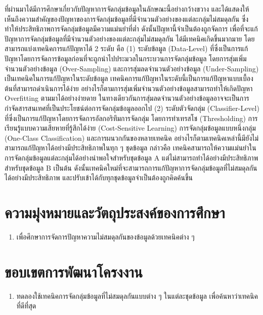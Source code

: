 ที่ผ่านมาได้มีการศึกษาเกี่ยวกับปัญหาการจัดกลุ่มข้อมูลในลักษณะนี้อย่างกว้างขวาง และได้แสดงให้เห็นถึงความสำคัญของปัญหาของการจัดกลุ่มข้อมูลที่มีจำนวนตัวอย่างของแต่ละกลุ่มไม่สมดุลกัน 
ซึ่งทำให้ประสิทธิภาพการจัดกลุ่มข้อมูลมีความแม่นยำที่ต่ำ ดังนั้นปัญหานี้จำเป็นต้องถูกจัดการ \cite{Buda:2017} เพื่อที่จะแก้ปัญหาการจัดกลุ่มข้อมูลที่มีจำนวนตัวอย่างของแต่ละกลุ่มไม่สมดุลกัน 
ได้มีเทคนิคเกิดขึ้นมากมาย โดยสามารถแบ่งเทคนิคการแก้ปัญหาได้ 2 ระดับ คือ (1) ระดับข้อมูล (Data-Level) 
ที่ซึ่งเป็นการแก้ปัญหาโดยการจัดการข้อมูลก่อนที่จะถูกนำไปประมวลในกระบวนการจัดกลุ่มข้อมูล โดยการสุ่มเพิ่มจำนวนตัวอย่างข้อมูล (Over-Sampling) และการสุ่มลดจำนวนตัวอย่างข้อมูล 
(Under-Sampling) เป็นเทคนิคในการแก้ปัญหาในระดับข้อมูล เทคนิคการแก้ปัญหาในระดับนี้เป็นการแก้ปัญหาแบบเบื้องต้นที่สามารถดำเนินการได้ง่าย 
อย่างไรก็ตามการสุ่มเพิ่มจำนวนตัวอย่างข้อมูลสามารถทำให้เกิดปัญหา Overfitting ตามมาได้อย่างง่ายดาย 
ในทางเดียวกันการสุ่มลดจำนวนตัวอย่างข้อมูลอาจจะเป็นการกำจัดสารสนเทศที่เป็นประโยชน์ต่อการจัดกลุ่มข้อมูลออกไป (2) ระดับตัวจัดกลุ่ม (Classifier-Level) 
ที่ซึ่งเป็นการแก้ปัญหาโดยการจัดการอัลกอริทึมการจัดกลุ่ม โดยการทำเทรสโช (Thresholding) การเรียนรู้แบบความเสียหายที่รู้สึกได้ง่าย (Cost-Sensitive Learning) 
การจัดกลุ่มข้อมูลแบบหนึ่งกลุ่ม (One-Class Classification) และการผนวกกันของหลายเทคนิค อย่างไรก็ตามเทคนิคเหล่านี้มียังไม่สามารถแก้ปัญหาได้อย่างมีประสิทธิภาพในทุก ๆ ชุดข้อมูล 
กล่าวคือ เทคนิคสามารถให้ความแม่นยำในการจัดกลุ่มข้อมูลแต่ละกลุ่มได้อย่างน่าพอใจสำหรับชุดข้อมูล A แต่ไม่สามารถทำได้อย่างมีประสิทธิภาพสำหรับชุดข้อมูล B เป็นต้น 
ดังนั้นเทคนิคใหม่ที่จะสามารถการแก้ปัญหาการจัดกลุ่มข้อมูลที่ไม่สมดุลกันได้อย่างมีประสิทธิภาพ และปรับเข้าได้กับทุกชุดข้อมูลจำเป็นต้องถูกคิดค้นขึ้น

\section{ความมุ่งหมายและวัตถุประสงค์ของการศึกษา}
\begin{enumerate}
	\item เพื่อศึกษาการจัดการปัญหาความไม่สมดุลกันของข้อมูลด้วยเทคนิคต่าง ๆ
\end{enumerate}
\section{ขอบเขตการพัฒนาโครงงาน}
\begin{enumerate}
	\item ทดลองใช้เทคนิคการจัดกลุ่มข้อมูลที่ไม่สมดุลกันแบบต่าง ๆ ในแต่ละชุดข้อมูล เพื่อค้นหาว่าเทคนิคที่ดีที่สุด
\end{enumerate}
